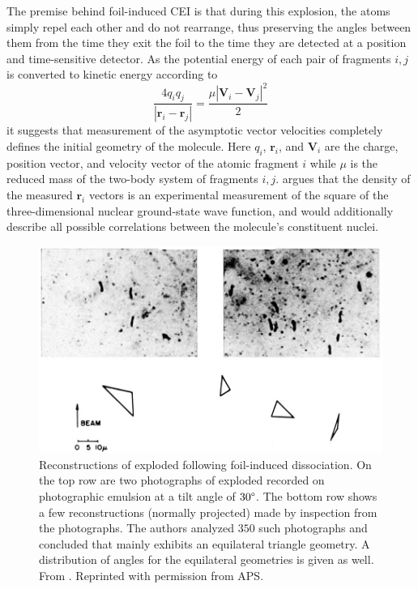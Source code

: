The premise behind foil-induced CEI is that during this explosion, the atoms simply repel each other and do not rearrange, thus preserving the angles between them from the time they exit the foil to the time they are detected at a position and time-sensitive detector. As the potential energy of each pair of fragments $i,j$ is converted to kinetic energy according to
\begin{equation} \label{eq:foilCEI}
\frac{4q_i q_j}{|\mathbf{r}_i - \mathbf{r}_j|} = \frac{\mu|\mathbf{V}_i - \mathbf{V}_j|^2}{2}
\end{equation}
it suggests that measurement of the asymptotic vector velocities completely defines the initial geometry of the molecule. Here $q_i$, $\mathbf{r}_i$, and $\mathbf{V}_i$ are the charge, position vector, and velocity vector of the atomic fragment $i$ while $\mu$ is the reduced mass of the two-body system of fragments $i,j$. \citet{Vager89} argues that the density of the measured $\mathbf{r}_i$ vectors is an experimental measurement of the square of the three-dimensional nuclear ground-state wave function, and would additionally describe all possible correlations between the molecule's constituent nuclei.

\begin{figure}
  \centering
  \includegraphics[width=\textwidth]{gfx/HydrogenTrimerReconstruction.jpg}
  \caption[Reconstructions of exploded  following foil-induced dissociation.]
  {Reconstructions of exploded  following foil-induced dissociation. On the top row are two photographs of exploded  recorded on photographic emulsion at a tilt angle of $30\degree$. The bottom row shows a few reconstructions (normally projected) made by inspection from the photographs. The authors analyzed $350$ such photographs and concluded that  mainly exhibits an equilateral triangle geometry. A distribution of angles for the equilateral geometries is given as well. From \citet{Gaillard78}. Reprinted with permission from APS.}
  \label{fig:hydrogenTrimer}
\end{figure}

